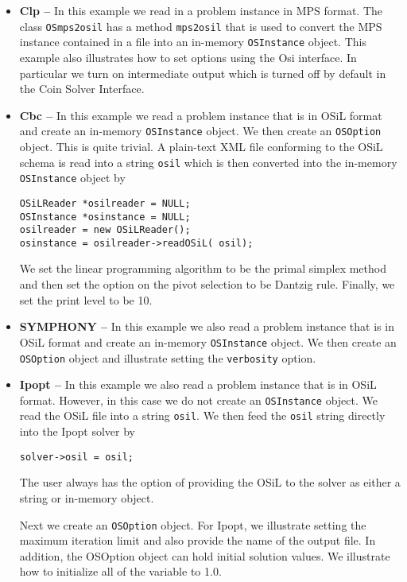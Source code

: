 \documentclass[11pt]{article}
\renewcommand{\_}{{\char"5F}}
\renewcommand{\{}{{\char"7B}}
\renewcommand{\}}{{\char"7D}}
\renewcommand{\^}{{\char"0D}}
\renewcommand{\'}{{\char"0D}}
\begin{document}
\begin{itemize}
\item {\bf Clp --}  In this example we read in a problem instance in MPS format.  The class 
{\tt OSmps2osil}  has a method {\tt mps2osil} that is used to convert the MPS instance contained 
in a file into an in-memory {\tt OSInstance} object. This example also illustrates how to 
set options using the Osi interface. In particular we turn on intermediate output which is 
turned off by default in the Coin Solver Interface. 

\item {\bf Cbc --}  In this example we read a problem instance that is in OSiL format and create 
an in-memory {\tt OSInstance} object.  We then create an {\tt OSOption} object.  This is quite trivial.  
A  plain-text XML file conforming to the OSiL schema is read into a string {\tt osil} which is then 
converted into the in-memory {\tt OSInstance} object by

\begin{verbatim}
OSiLReader *osilreader = NULL;
OSInstance *osinstance = NULL;
osilreader = new OSiLReader(); 
osinstance = osilreader->readOSiL( osil);
\end{verbatim}


 We set the linear programming algorithm to be the primal simplex method and then set the option 
on the pivot selection to be Dantzig rule.  Finally, we set the print level to be 10.

\item {\bf SYMPHONY --}   In this example we also read a problem instance that is in OSiL format and 
create an in-memory {\tt OSInstance} object.  We then create an {\tt OSOption} object and 
illustrate setting the {\tt verbosity} option.

\item {\bf Ipopt --}   In this example we also read a problem instance that is in OSiL format.  
However, in this case we do  not create an {\tt OSInstance} object. We read the OSiL file into 
a string {\tt osil}.  We then feed the {\tt osil} string directly into the Ipopt solver by
\begin{verbatim}
solver->osil = osil;
\end{verbatim} 
The user always has the option of providing the OSiL to the solver as either a string or in-memory object.

Next we create an {\tt OSOption} object. For Ipopt, we illustrate setting the maximum iteration limit 
and also provide the name of the output file. In addition, the OSOption object can hold initial solution 
values. We illustrate how to initialize all of the variable to 1.0.


\end{itemize}
\end{document}
